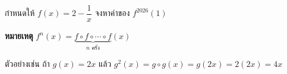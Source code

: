 ﻿%
\question กำหนดให้ $f(x) = 2-\dfrac{1}{x}$ จงหาค่าของ $f^{2026}(1)$
\vspace{0.5em}

\textbf{หมายเหตุ} $f^{n}(x) = \underbrace{f \circ f \circ \cdots \circ f}_{n \text{ ครั้ง}}(x)$

\vspace{0.5em}
ตัวอย่างเช่น ถ้า $g(x)=2x$ แล้ว $g^2(x)=g \circ g(x)=g(2x)=2(2x)=4x$
\vspace{0.5em}
\newline
{}
